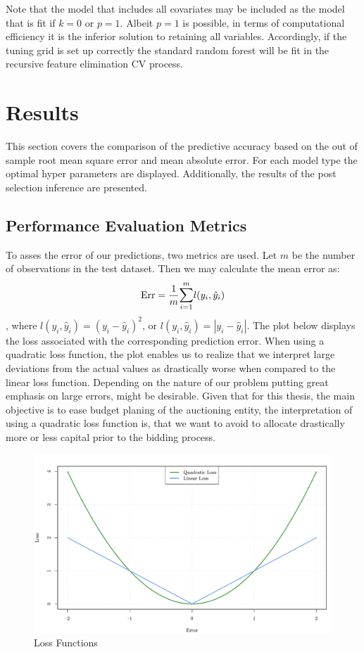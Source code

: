 \documentclass[a4paper,12pt, headsepline]{scrartcl}
\numberwithin{equation}{section}
\begin{document}
Note that the model that includes all covariates may be included  as the model that is fit if $k = 0$ or $p = 1$. Albeit $p = 1$ is possible, in terms of computational efficiency it is the inferior solution to retaining all variables. Accordingly, if the tuning grid is set up correctly the standard random forest will be fit in the recursive feature elimination CV process. 

\section{Results}\label{sec:res}
This section covers the comparison of the predictive accuracy based on the out of sample root mean square error and mean absolute error. For each model type the optimal hyper parameters are displayed. Additionally, the results of the post selection inference are presented.

\subsection{Performance Evaluation Metrics}\label{subsec:per}
To asses the error of our predictions, two metrics are used. Let $m$ be the number of observations in the test dataset. Then we may calculate the mean error as:
\[
\text{Err} = \frac{1}{m} \mathlarger{\sum}\limits_{i = 1}^{m} l(y_i, \hat y_i)
\], where $l(y_i, \hat y_i) =( y_i - \hat y_i)^2 \text{, or } l(y_i, \hat y_i) = |y_i - \hat y_i|$. The plot below displays the loss associated with the corresponding prediction error. When using a quadratic loss function, the plot enables us to realize that we interpret large deviations from the actual values as drastically worse when compared to the linear loss function. Depending on the nature of our problem putting great emphasis on large errors, might be desirable. Given that for this thesis, the main objective is to ease budget planing of the auctioning entity, the interpretation of using a quadratic loss function is, that we want to avoid to allocate drastically more or less capital prior to the bidding process.
\begin{figure}[H]
	\includegraphics[width = 14	cm]{figures/Lossfun.pdf}
	\caption{Loss Functions}\label{fig:lossfun}
\end{figure}
\end{document}
